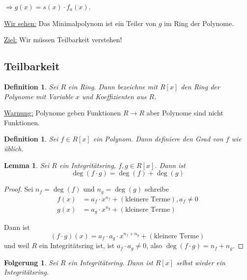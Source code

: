 \documentclass[a4paper,12pt,numbers=noenddot,parskip=full]{scrartcl}
\newcommand{\heading}{\underline}
\theoremstyle{dotless}
\newtheorem{corollary}[theorem]{Folgerung}
\newtheorem{lemma}[theorem]{Lemma}
\newtheorem{definition}[theorem]{Definition}
\theoremstyle{remark}
\begin{document}
 	$\Rightarrow g(x) = s(x) \cdot f_a(x)$.
 	
 	\heading{Wir sehen:} Das Minimalpolynom ist ein Teiler von $g$ im Ring der Polynome.
 	
 	\heading{Ziel:} Wir müssen Teilbarkeit verstehen!
 	
 	\subsection{Teilbarkeit}
 	
 	\begin{definition}
 		Sei $R$ ein Ring. Dann bezeichne mit $R[x]$ den Ring der Polynome mit Variable $x$ und Koeffizienten aus $R$.
 	\end{definition}
 
 	\heading{Warnung:} Polynome geben Funktionen $R \to R$ aber Polynome sind nicht Funktionen.
 	
 	\begin{definition}
 		Sei $f \in R[x]$ ein Polynom. Dann definiere den Grad von $f$ wie üblich.
 	\end{definition}
 
 	\begin{lemma}
 		Sei $R$ ein Integritätsring, $f,g \in R[x]$. Dann ist
 		\begin{equation*}
	 		\deg(f \cdot g) = \deg(f) + \deg(g)
 		\end{equation*}
 	\end{lemma}
 
 	\begin{proof}
 		Sei $n_f = \deg(f)$ und $n_g = \deg(g)$ schreibe
 		\begin{align*}
	 		f(x) &= a_f \cdot x^{n_f} + (\text{kleinere Terme}), a_f \neq 0 \\
	 		g(x) &= a_g \cdot x^{n_g} + (\text{kleinere Terme})
 		\end{align*}
 		
 		Dann ist
 		\begin{equation*}
 			(f \cdot g)(x) = a_f \cdot a_g \cdot x^{n_f + n_g} + (\text{kleinere Terme})
 		\end{equation*}
 		und weil $R$ ein Integritätsring ist, ist $a_f \cdot a_g \neq 0$, also $\deg(f \cdot g) = n_f + n_g$.
 	\end{proof}
 
 	\begin{corollary}
 		Sei $R$ ein Integritätsring. Dann ist $R[x]$ selbst wieder ein Integritätsring.
 	\end{corollary}
 
\end{document}
